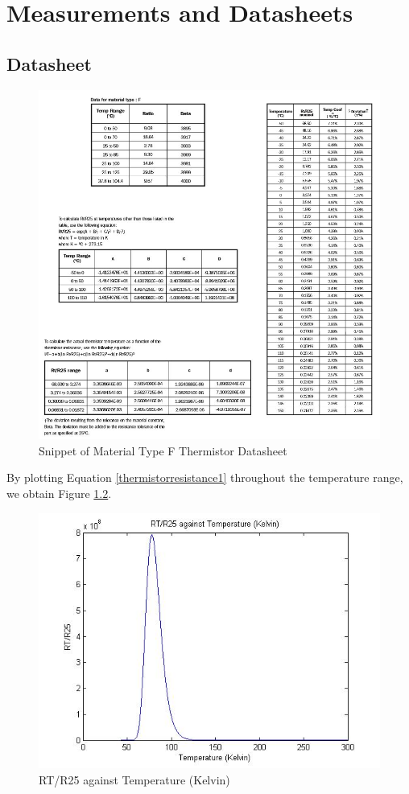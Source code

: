 \chapter{Measurements and Datasheets} 

\section{Datasheet}

\begin{figure}[H]
	\centering
	\includegraphics[width=1.05\linewidth]{thermistordatasheet.jpg}
	\caption{Snippet of Material Type F Thermistor Datasheet \cite{thermistor}}
	\label{thermistordatasheet}
\end{figure}

By plotting Equation \ref{thermistorresistance1} throughout the temperature range, we obtain Figure \ref{RTR25temperature}. 

\begin{figure}[H]
	\centering
	\includegraphics[width=0.8\linewidth]{thermistor4.jpg}
	\caption{RT/R25 against Temperature (Kelvin)}
	\label{RTR25temperature}
\end{figure}

